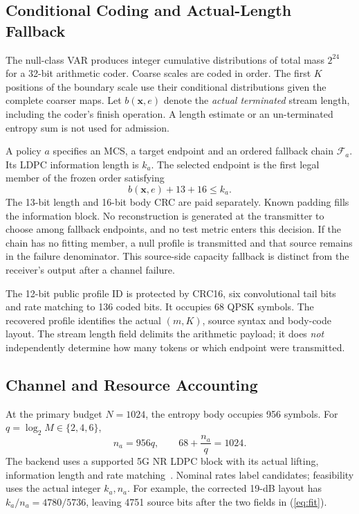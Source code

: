 \subsection{Conditional Coding and Actual-Length Fallback}
The null-class VAR produces integer cumulative distributions of total mass $2^{24}$ for a 32-bit arithmetic coder. Coarse scales are coded in order. The first $K$ positions of the boundary scale use their conditional distributions given the complete coarser maps. Let $b(\mathbf x,e)$ denote the \emph{actual terminated} stream length, including the coder's finish operation. A length estimate or an un-terminated entropy sum is not used for admission.

A policy $a$ specifies an MCS, a target endpoint and an ordered fallback chain $\mathcal F_a$. Its LDPC information length is $k_a$. The selected endpoint is the first legal member of the frozen order satisfying
\begin{equation}
 b(\mathbf x,e)+13+16\leq k_a.
\label{eq:fit}
\end{equation}
The 13-bit length and 16-bit body CRC are paid separately. Known padding fills the information block. No reconstruction is generated at the transmitter to choose among fallback endpoints, and no test metric enters this decision. If the chain has no fitting member, a null profile is transmitted and that source remains in the failure denominator. This source-side capacity fallback is distinct from the receiver's output after a channel failure.

The 12-bit public profile ID is protected by CRC16, six convolutional tail bits and rate matching to 136 coded bits. It occupies 68 QPSK symbols. The recovered profile identifies the actual $(m,K)$, source syntax and body-code layout. The stream length field delimits the arithmetic payload; it does \emph{not} independently determine how many tokens or which endpoint were transmitted.

\subsection{Channel and Resource Accounting}
At the primary budget $N=1024$, the entropy body occupies 956 symbols. For $q=\log_2M\in\{2,4,6\}$,
\begin{equation}
 n_a=956q,\qquad 68+\frac{n_a}{q}=1024.
\end{equation}
The backend uses a supported 5G NR LDPC block with its actual lifting, information length and rate matching~\cite{3gpp38212}. Nominal rates label candidates; feasibility uses the actual integer $k_a,n_a$. For example, the corrected 19-dB layout has $k_a/n_a=4780/5736$, leaving 4751 source bits after the two fields in (\ref{eq:fit}).

